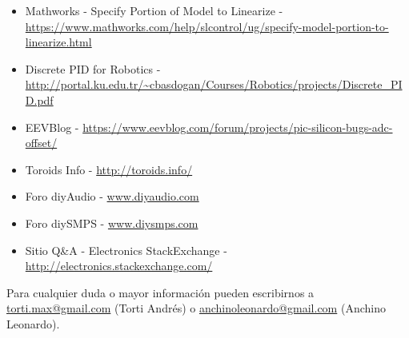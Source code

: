 \documentclass[12pt]{report}
\begin{document}
\begin{itemize}
	\item Mathworks - Specify Portion of Model to Linearize - \url{https://www.mathworks.com/help/slcontrol/ug/specify-model-portion-to-linearize.html}
	\item Discrete PID for Robotics - \url{http://portal.ku.edu.tr/~cbasdogan/Courses/Robotics/projects/Discrete_PID.pdf}
	\item EEVBlog - \url{https://www.eevblog.com/forum/projects/pic-silicon-bugs-adc-offset/}
	\item Toroids Info - \url{http://toroids.info/}
	\item Foro diyAudio - \url{www.diyaudio.com}
	\item Foro diySMPS - \url{www.diysmps.com}
	\item Sitio Q\&A - Electronics StackExchange - \url{http://electronics.stackexchange.com/}
\end{itemize}

Para cualquier duda o mayor información pueden escribirnos a \href{mailto:torti.max@gmail.com}{torti.max@gmail.com} (Torti Andrés) o \href{mailto:anchinoleonardo@gmail.com}{anchinoleonardo@gmail.com} (Anchino Leonardo).
\end{document}
